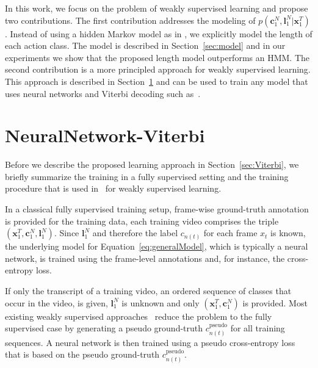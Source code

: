 \documentclass[10pt,twocolumn,letterpaper]{article}
\begin{document}
In this work, we focus on the problem of weakly supervised learning and propose two contributions. The first contribution addresses the modeling of $p(\mathbf{c}_1^N, \mathbf{l}_1^N | \mathbf{x}_1^T)$. Instead of using a hidden Markov model as in \cite{kuehne2017weakly,koller2016deephand,richard2017weakly,koller2017resign}, we explicitly model the length of each action class. The model is described in Section~\ref{sec:model} and in our experiments we show that the proposed length model outperforms an HMM. The second contribution is a more principled approach for weakly supervised learning. This approach is described in Section~\ref{sec:end2endViterbi} and can be used to train any model that uses neural networks and Viterbi decoding such as~\cite{koller2016deephand,richard2017weakly,koller2017resign}.





\section{NeuralNetwork-Viterbi}
\label{sec:end2endViterbi}


Before we describe the proposed learning approach in Section~\ref{sec:Viterbi}, we briefly summarize the training in a fully supervised setting and the training procedure that is used in~\cite{kuehne2017weakly,koller2016deephand,richard2017weakly,koller2017resign} for weakly supervised learning.   
 
In a classical fully supervised training setup, frame-wise ground-truth annotation
is provided for the training data, \ie each training video comprises the triple $ (\mathbf{x}_1^T, \mathbf{c}_1^N, \mathbf{l}_1^N) $. 
Since $\mathbf{l}_1^N$ and therefore the label $ c_{n(t)} $ for each frame $ x_t $ is known, the underlying model for Equation~\eqref{eq:generalModel}, which is typically a neural network, is trained using the frame-level annotations and, for instance, the cross-entropy loss.



If only the transcript of a training video, \ie an ordered sequence of classes that occur in the video, is given, $\mathbf{l}_1^N$ is unknown and only $ (\mathbf{x}_1^T, \mathbf{c}_1^N) $ is provided. Most existing weakly supervised approaches~\cite{kuehne2017weakly,koller2016deephand,richard2017weakly,koller2017resign}
reduce the problem to the fully supervised case by generating a pseudo ground-truth $c^{\text{pseudo}}_{n(t)}$
for all training sequences. A neural network is then trained using a pseudo cross-entropy
loss that is based on the pseudo ground-truth $c^{\text{pseudo}}_{n(t)}$. 
\end{document}
